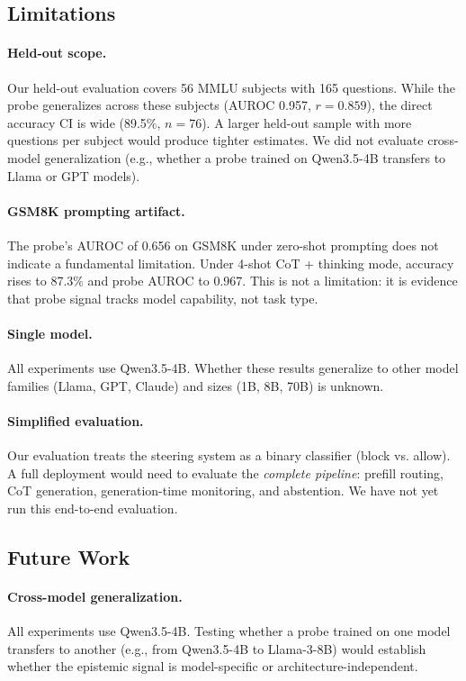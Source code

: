 \documentclass{article}
\begin{document}
\subsection{Limitations}

\paragraph{Held-out scope.}
Our held-out evaluation covers 56 MMLU subjects with 165 questions. While the probe generalizes across these subjects (AUROC 0.957, $r{=}0.859$), the direct accuracy CI is wide (89.5\%, $n{=}76$). A larger held-out sample with more questions per subject would produce tighter estimates. We did not evaluate cross-model generalization (e.g., whether a probe trained on Qwen3.5-4B transfers to Llama or GPT models).

\paragraph{GSM8K prompting artifact.}
The probe's AUROC of 0.656 on GSM8K under zero-shot prompting does not indicate a fundamental limitation. Under 4-shot CoT + thinking mode, accuracy rises to 87.3\% and probe AUROC to 0.967. This is not a limitation: it is evidence that probe signal tracks model capability, not task type.

\paragraph{Single model.}
All experiments use Qwen3.5-4B. Whether these results generalize to other model families (Llama, GPT, Claude) and sizes (1B, 8B, 70B) is unknown.

\paragraph{Simplified evaluation.}
Our evaluation treats the steering system as a binary classifier (block vs. allow). A full deployment would need to evaluate the \emph{complete pipeline}: prefill routing, CoT generation, generation-time monitoring, and abstention. We have not yet run this end-to-end evaluation.

\subsection{Future Work}

\paragraph{Cross-model generalization.}
All experiments use Qwen3.5-4B. Testing whether a probe trained on one model transfers to another (e.g., from Qwen3.5-4B to Llama-3-8B) would establish whether the epistemic signal is model-specific or architecture-independent.
\end{document}
